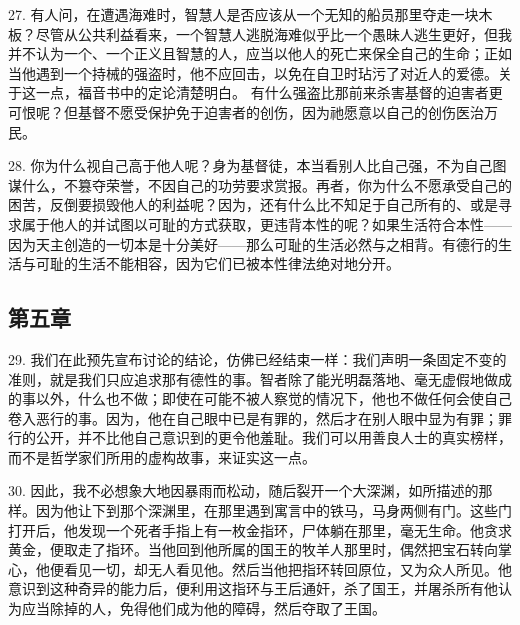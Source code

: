 27. 有人问，在遭遇海难时，智慧人是否应该从一个无知的船员那里夺走一块木板？尽管从公共利益看来，一个智慧人逃脱海难似乎比一个愚昧人逃生更好，但我并不认为一个、一个正义且智慧的人，应当以他人的死亡来保全自己的生命；正如当他遇到一个持械的强盗时，他不应回击，以免在自卫时玷污了对近人的爱德。关于这一点，福音书中的定论清楚明白。 有什么强盗比那前来杀害基督的迫害者更可恨呢？但基督不愿受保护免于迫害者的创伤，因为祂愿意以自己的创伤医治万民。\par

28. 你为什么视自己高于他人呢？身为基督徒，本当看别人比自己强，不为自己图谋什么，不篡夺荣誉，不因自己的功劳要求赏报。再者，你为什么不愿承受自己的困苦，反倒要损毁他人的利益呢？因为，还有什么比不知足于自己所有的、或是寻求属于他人的并试图以可耻的方式获取，更违背本性的呢？如果生活符合本性——因为天主创造的一切本是十分美好——那么可耻的生活必然与之相背。有德行的生活与可耻的生活不能相容，因为它们已被本性律法绝对地分开。\par


\subsection{第五章}

\par

29. 我们在此预先宣布讨论的结论，仿佛已经结束一样：我们声明一条固定不变的准则，就是我们只应追求那有德性的事。智者除了能光明磊落地、毫无虚假地做成的事以外，什么也不做；即使在可能不被人察觉的情况下，他也不做任何会使自己卷入恶行的事。因为，他在自己眼中已是有罪的，然后才在别人眼中显为有罪；罪行的公开，并不比他自己意识到的更令他羞耻。我们可以用善良人士的真实榜样，而不是哲学家们所用的虚构故事，来证实这一点。\par

30. 因此，我不必想象大地因暴雨而松动，随后裂开一个大深渊，如所描述的那样。因为他让下到那个深渊里，在那里遇到寓言中的铁马，马身两侧有门。这些门打开后，他发现一个死者手指上有一枚金指环，尸体躺在那里，毫无生命。他贪求黄金，便取走了指环。当他回到他所属的国王的牧羊人那里时，偶然把宝石转向掌心，他便看见一切，却无人看见他。然后当他把指环转回原位，又为众人所见。他意识到这种奇异的能力后，便利用这指环与王后通奸，杀了国王，并屠杀所有他认为应当除掉的人，免得他们成为他的障碍，然后夺取了王国。\par

